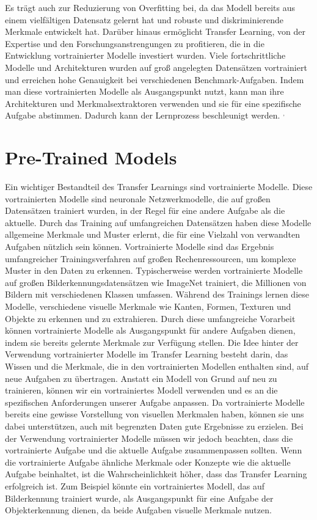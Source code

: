     Es trägt auch zur Reduzierung von Overfitting bei, da das Modell bereits aus einem vielfältigen Datensatz gelernt hat und robuste und diskriminierende Merkmale entwickelt hat.
    Darüber hinaus ermöglicht Transfer Learning, von der Expertise und den Forschungsanstrengungen zu profitieren, die in die Entwicklung vortrainierter Modelle investiert wurden. 
    Viele fortschrittliche Modelle und Architekturen wurden auf groß angelegten Datensätzen vortrainiert und erreichen hohe Genauigkeit bei verschiedenen Benchmark-Aufgaben. 
    Indem man diese vortrainierten Modelle als Ausgangspunkt nutzt, kann man ihre Architekturen und Merkmalsextraktoren verwenden und sie für eine spezifische Aufgabe abstimmen. Dadurch kann der Lernprozess beschleunigt werden.
    $^{,}$

\section{Pre-Trained Models}

    Ein wichtiger Bestandteil des Transfer Learnings sind vortrainierte Modelle. 
    Diese vortrainierten Modelle sind neuronale Netzwerkmodelle, die auf großen Datensätzen trainiert wurden, in der Regel für eine andere Aufgabe als die aktuelle. 
    Durch das Training auf umfangreichen Datensätzen haben diese Modelle allgemeine Merkmale und Muster erlernt, die für eine Vielzahl von verwandten Aufgaben nützlich sein können.
    Vortrainierte Modelle sind das Ergebnis umfangreicher Trainingsverfahren auf großen Rechenressourcen, um komplexe Muster in den Daten zu erkennen. 
    Typischerweise werden vortrainierte Modelle auf großen Bilderkennungsdatensätzen wie ImageNet trainiert, die Millionen von Bildern mit verschiedenen Klassen umfassen. 
    Während des Trainings lernen diese Modelle, verschiedene visuelle Merkmale wie Kanten, Formen, Texturen und Objekte zu erkennen und zu extrahieren. 
    Durch diese umfangreiche Vorarbeit können vortrainierte Modelle als Ausgangspunkt für andere Aufgaben dienen, indem sie bereits gelernte Merkmale zur Verfügung stellen.
    Die Idee hinter der Verwendung vortrainierter Modelle im Transfer Learning besteht darin, das Wissen und die Merkmale, die in den vortrainierten Modellen enthalten sind, auf neue Aufgaben zu übertragen. 
    Anstatt ein Modell von Grund auf neu zu trainieren, können wir ein vortrainiertes Modell verwenden und es an die spezifischen Anforderungen unserer Aufgabe anpassen. 
    Da vortrainierte Modelle bereits eine gewisse Vorstellung von visuellen Merkmalen haben, können sie uns dabei unterstützen, auch mit begrenzten Daten gute Ergebnisse zu erzielen.
    Bei der Verwendung vortrainierter Modelle müssen wir jedoch beachten, dass die vortrainierte Aufgabe und die aktuelle Aufgabe zusammenpassen sollten.
    Wenn die vortrainierte Aufgabe ähnliche Merkmale oder Konzepte wie die aktuelle Aufgabe beinhaltet, ist die Wahrscheinlichkeit höher, dass das Transfer Learning erfolgreich ist. 
    Zum Beispiel könnte ein vortrainiertes Modell, das auf Bilderkennung trainiert wurde, als Ausgangspunkt für eine Aufgabe der Objekterkennung dienen, da beide Aufgaben visuelle Merkmale nutzen.

